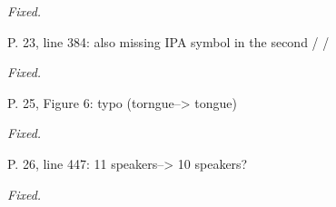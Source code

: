 \documentclass[]{article}
\begin{document}
\begin{adjustwidth}{1cm}{} \textit{
Fixed.
} \end{adjustwidth}

P. 23, line 384: also missing IPA symbol in the second / /

\begin{adjustwidth}{1cm}{} \textit{
Fixed.
} \end{adjustwidth}

P. 25, Figure 6: typo (torngue--\textgreater{} tongue)

\begin{adjustwidth}{1cm}{} \textit{
Fixed.
} \end{adjustwidth}

P. 26, line 447: 11 speakers--\textgreater{} 10 speakers?

\begin{adjustwidth}{1cm}{} \textit{
Fixed.
} \end{adjustwidth}
\end{document}
